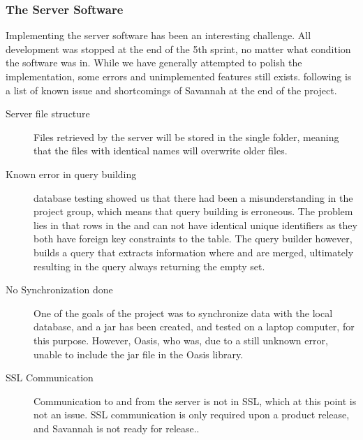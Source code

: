 \subsubsection*{The Server Software}
Implementing the server software has been an interesting challenge. All development was stopped at the end of the 5th sprint, no matter what condition the software was in. While we have generally attempted to polish the implementation, some errors and unimplemented features still exists. following is a list of known issue and shortcomings of Savannah at the end of the project.
\begin{description}
 \item[Server file structure] Files retrieved by the server will be stored in the single folder, meaning that the files with identical names will overwrite older files.

 \item[Known error in query building] database testing showed us that there had been a misunderstanding in the project group, which means that query building is erroneous. The problem lies in that rows in the  and  can not have identical unique identifiers as they both have foreign key constraints to the  table. The query builder however, builds a query that extracts information where  and  are merged, ultimately resulting in the query always returning the empty set.

 \item[No Synchronization done] One of the goals of the project was to synchronize data with the local database, and a jar has been created, and tested on a laptop computer, for this purpose. However, Oasis, who was, due to a still unknown error, unable to include the jar file in the Oasis library.

 \item[SSL Communication] Communication to and from the server is not in SSL, which at this point is not an issue. SSL communication is only required upon a product release, and Savannah is not ready for release..
 
\end{description}


